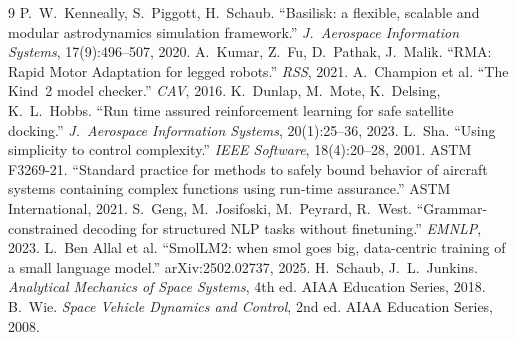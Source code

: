\documentclass[11pt]{article}
\begin{document}
\begin{thebibliography}{9}\small
{} P.~W.~Kenneally, S.~Piggott, H.~Schaub. ``Basilisk: a flexible, scalable and modular astrodynamics simulation framework.'' \emph{J.\ Aerospace Information Systems}, 17(9):496--507, 2020.
 A.~Kumar, Z.~Fu, D.~Pathak, J.~Malik. ``RMA: Rapid Motor Adaptation for legged robots.'' \emph{RSS}, 2021.
 A.~Champion et al. ``The Kind~2 model checker.'' \emph{CAV}, 2016.
 K.~Dunlap, M.~Mote, K.~Delsing, K.~L.~Hobbs. ``Run time assured reinforcement learning for safe satellite docking.'' \emph{J.\ Aerospace Information Systems}, 20(1):25--36, 2023.
 L.~Sha. ``Using simplicity to control complexity.'' \emph{IEEE Software}, 18(4):20--28, 2001.
 ASTM F3269-21. ``Standard practice for methods to safely bound behavior of aircraft systems containing complex functions using run-time assurance.'' ASTM International, 2021.
 S.~Geng, M.~Josifoski, M.~Peyrard, R.~West. ``Grammar-constrained decoding for structured NLP tasks without finetuning.'' \emph{EMNLP}, 2023.
 L.~Ben Allal et al. ``SmolLM2: when smol goes big, data-centric training of a small language model.'' arXiv:2502.02737, 2025.
 H.~Schaub, J.~L.~Junkins. \emph{Analytical Mechanics of Space Systems}, 4th ed. AIAA Education Series, 2018.
 B.~Wie. \emph{Space Vehicle Dynamics and Control}, 2nd ed. AIAA Education Series, 2008.
\end{thebibliography}
\end{document}
